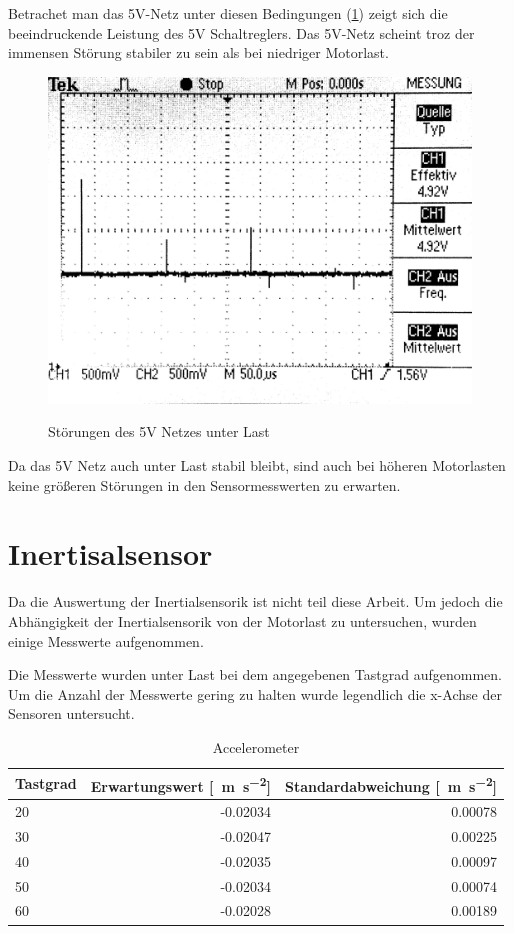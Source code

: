 Betrachet man das 5V-Netz unter diesen Bedingungen (\cref{fig:5V_last}) zeigt sich die beeindruckende Leistung des 5V Schaltreglers.
Das 5V-Netz scheint troz der immensen Störung stabiler zu sein als bei niedriger Motorlast. 

\begin{figure}[H]
\centering
\includegraphics[width=.8\textwidth]{5V_LAST.png}\\
\caption{Störungen des 5V Netzes unter Last}%
\label{fig:5V_last}
\end{figure}

Da das 5V Netz auch unter Last stabil bleibt, sind auch bei höheren Motorlasten keine größeren Störungen in den Sensormesswerten zu erwarten.


\section{Inertisalsensor}

Da die Auswertung der Inertialsensorik ist nicht teil diese Arbeit. Um jedoch die Abhängigkeit der Inertialsensorik von der Motorlast
zu untersuchen, wurden einige Messwerte aufgenommen.

Die Messwerte wurden unter Last bei dem angegebenen Tastgrad aufgenommen. Um die Anzahl der Messwerte gering zu halten wurde legendlich die x-Achse der Sensoren untersucht.

\begin{table}[H]
  \centering
  \begin{tabularx}{\textwidth}{|X|r|r|}
    \hline
     Tastgrad & Erwartungswert [\SI{}{\metre\per\second\squared}] & Standardabweichung [\SI{}{\metre\per\second\squared}]  \\ \hline \hline
     20 & -0.02034  & 0.00078 \\ \hline
     30 & -0.02047  & 0.00225 \\ \hline
     40 & -0.02035  & 0.00097 \\ \hline
     50 & -0.02034  & 0.00074 \\ \hline
     60 & -0.02028  & 0.00189 \\ \hline
  \end{tabularx}
  \caption{Accelerometer}%
  \label{tab:acc}
\end{table}

